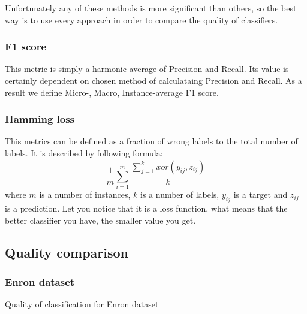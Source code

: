 Unfortunately any of these methods is more significant than others, so the best way is to use every approach in order to compare the quality of classifiers.  

\subsubsection{F1 score}

This metric is simply a harmonic average of Precision and Recall. Its value is certainly dependent on chosen method of calculataing Precision and Recall. As a result we define Micro-, Macro, Instance-average F1 score. 

\subsubsection{Hamming loss}

This metrics can be defined as a fraction of wrong labels to the total number of labels. It is described by following formula:
\begin{equation}
\label{eq:exp1}
    \frac{1}{m}\sum\limits_{i=1}^{m}\frac{\sum\limits_{j=1}^{k}xor(y_{ij}, z_{ij})}{k}
\end{equation}
where $m$ is a number of instances, $k$ is a number of labels, $y_{ij}$ is a target and $z_{ij}$ is a prediction. Let you notice that it is a loss function, what means that the better classifier you have, the smaller value you get.  

\subsection{Quality comparison}

\subsubsection{Enron dataset}

\begin{table}
\centering
\caption{Quality of classification for Enron dataset}
\label{tab:exp1}
\end{table}


